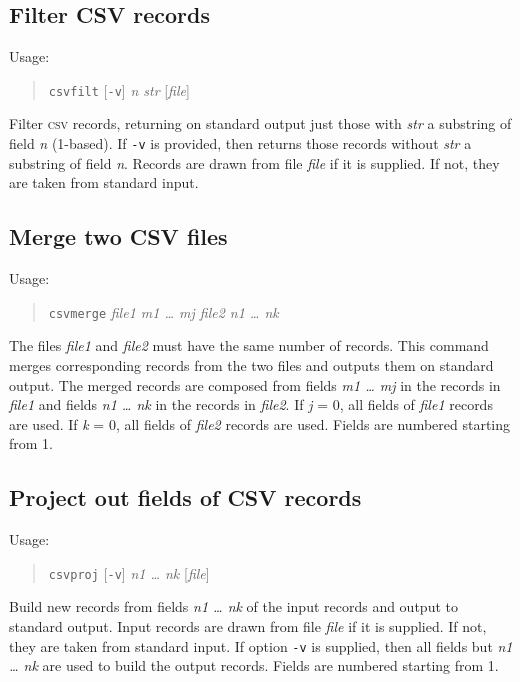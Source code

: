 \documentclass[12pt,fleqn]{article}
\newcommand{\csv}{\textsc{csv}}
\begin{document}
\subsection{Filter CSV records}
Usage:
\begin{quote}
   \texttt{csvfilt} [\texttt{-v}] \textit{n str} [\textit{file}]
\end{quote}
Filter \csv{} records, returning on standard output just those with
\textit{str} a substring of field \textit{n} (1-based).
%
If \texttt{-v} is provided, then returns those records without
\textit{str} a substring of field \textit{n}.
Records are drawn from file \textit{file} if it is supplied. If not, they
are taken from standard input.

\subsection{Merge two CSV files}
Usage:
\begin{quote}
   \texttt{csvmerge} \textit{file1 m1 \ldots{} mj file2 n1 \ldots{} nk}
\end{quote}
The files \textit{file1} and \textit{file2} must have the same number
of records.
This command merges corresponding records from the two files and outputs
them on standard output.
The merged records are composed from 
fields \textit{m1 \ldots{} mj} in the records in \textit{file1} and 
fields \textit{n1 \ldots{} nk} in the records in \textit{file2}.
If \textit{j} = 0, all fields of  \textit{file1} records are used.
If \textit{k} = 0, all fields of  \textit{file2} records are used.
Fields are numbered starting from 1.

\subsection{Project out fields of CSV records}
Usage:
\begin{quote}
  \texttt{csvproj} [\texttt{-v}] \textit{n1 \ldots{} nk} [\textit{file}]
\end{quote}
Build new records from fields \textit{n1 \ldots{} nk} of the input
records and output to standard output.  Input records are drawn from
file \textit{file} if it is supplied. If not, they are taken from
standard input.  If option \texttt{-v} is supplied, then all fields
but \textit{n1 \ldots{} nk} are used to build the output records.
Fields are numbered starting from 1.
\end{document}

